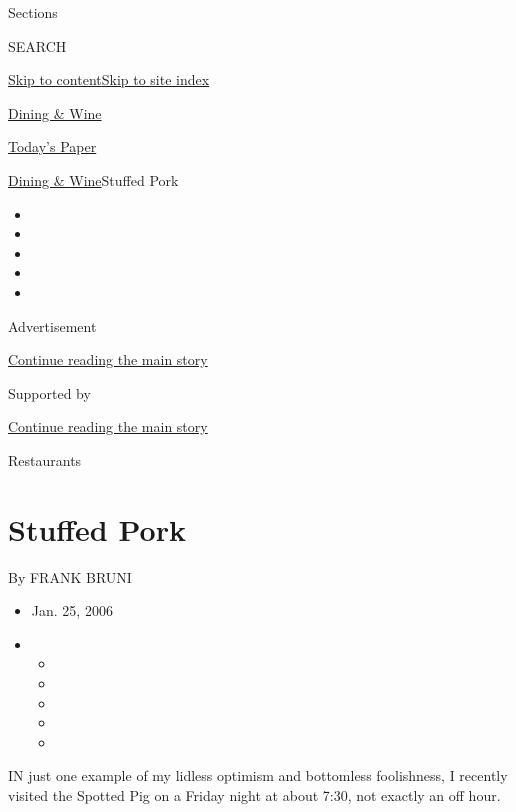 Sections

SEARCH

\protect\hyperlink{site-content}{Skip to
content}\protect\hyperlink{site-index}{Skip to site index}

\href{https://www.nytimes3xbfgragh.onion/pages/dining/index.html}{Dining
\& Wine}

\href{https://myaccount.nytimes3xbfgragh.onion/auth/login?response_type=cookie\&client_id=vi}{}

\href{https://www.nytimes3xbfgragh.onion/section/todayspaper}{Today's
Paper}

\href{/pages/dining/index.html}{Dining \& Wine}\textbar{}Stuffed Pork

\begin{itemize}
\item
\item
\item
\item
\item
\end{itemize}

Advertisement

\protect\hyperlink{after-top}{Continue reading the main story}

Supported by

\protect\hyperlink{after-sponsor}{Continue reading the main story}

Restaurants

\hypertarget{stuffed-pork}{%
\section{Stuffed Pork}\label{stuffed-pork}}

By FRANK BRUNI

\begin{itemize}
\item
  Jan. 25, 2006
\item
  \begin{itemize}
  \item
  \item
  \item
  \item
  \item
  \end{itemize}
\end{itemize}

IN just one example of my lidless optimism and bottomless foolishness, I
recently visited the Spotted Pig on a Friday night at about 7:30, not
exactly an off hour.

